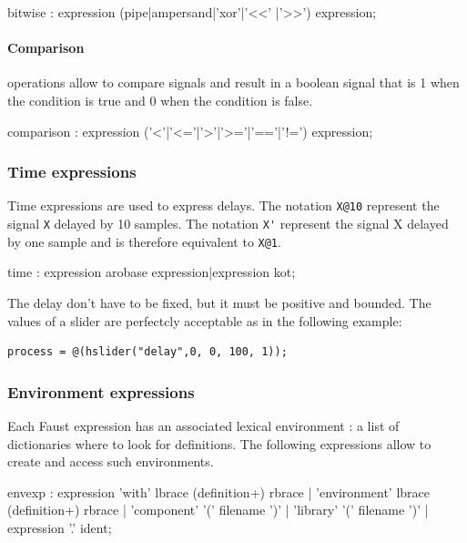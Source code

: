 \documentclass{article}
\begin{document}
\begin{rail}
bitwise : expression (pipe|ampersand|'xor'|'<<' |'>>') expression;
\end{rail}

\paragraph{Comparison} operations allow to compare signals and result in a boolean signal that is 1 when the condition is true and 0 when the condition is false.

\begin{rail}
comparison : expression ('<'|'<='|'>'|'>='|'=='|'!=') expression;
\end{rail}



\subsubsection{Time expressions}

Time expressions are used to express delays. The notation \lstinline'X@10' represent the signal \lstinline'X' delayed by 10 samples. The notation \lstinline"X'" represent the signal X delayed by one sample and is therefore equivalent to \lstinline'X@1'.

\begin{rail}
time : expression arobase expression|expression kot; 
\end{rail}

The delay don't have to be fixed, but it must be positive and bounded. The values of a slider are perfectcly acceptable as in the following example:

\begin{lstlisting}
process = @(hslider("delay",0, 0, 100, 1));
\end{lstlisting}

\subsubsection{Environment expressions}
Each Faust expression has an associated lexical environment : a list of dictionaries where to look for definitions. The following expressions allow to create and access such environments.

\begin{rail}
envexp :    expression 'with' lbrace (definition+) rbrace
          | 'environment' lbrace (definition+) rbrace
          | 'component' '(' filename ')'
          | 'library' '(' filename ')'
		  | expression '.' ident;
          
\end{rail}
\end{document}
